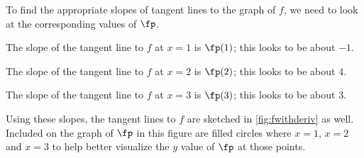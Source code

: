 {To find the appropriate slopes of tangent lines to the graph of $f$, we need to look at the corresponding values of $\fp$.

The slope of the tangent line to $f$ at $x=1$ is $\fp(1)$; this looks to be about $-1$.

The slope of the tangent line to $f$ at $x=2$ is $\fp(2)$; this looks to be about $4$. 

The slope of the tangent line to $f$ at $x=3$ is $\fp(3)$; this looks to be about $3$. 

Using these slopes, the tangent lines to $f$ are sketched in \autoref{fig:fwithderiv} as well. Included on the graph of $\fp$ in this figure are filled circles where $x=1$, $x=2$ and $x=3$ to help better visualize the $y$ value of $\fp$ at those points.}

